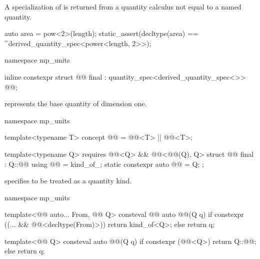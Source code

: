 \pnum
A specialization of 
is returned from a quantity calculus not equal to a named quantity.
\begin{example}
\begin{codeblock}
auto area = pow<2>(length);
static_assert(decltype(area) == ^derived_quantity_spec<power<length, 2>>);
\end{codeblock}
\end{example}

\begin{codeblock}
namespace mp_units {

inline constexpr struct @@ final : quantity_spec<derived_quantity_spec<>> {
} @@;

}
\end{codeblock}

\pnum
{} represents the base quantity of dimension one.

\begin{codeblock}
namespace mp_units {

template<typename T>
concept @@ = @@<T> || @@<T>;

template<typename Q>
  requires @@<Q> && @@<@@(Q{}), Q{}>
struct @@ final : Q::@@ {
  using @@ = kind_of_;
  static constexpr auto @@ = Q{};
};

}
\end{codeblock}

\pnum
{} specifies  to be treated as a quantity kind.

\begin{codeblock}
namespace mp_units {

template<@@ auto... From, @@ Q>
consteval @@ auto @@(Q q)
{
  if constexpr ((... && @@<decltype(From)>))
    return kind_of<Q{}>;
  else
    return q;
}

template<@@ Q>
consteval auto @@(Q q)
{
  if constexpr (@@<Q>)
    return Q::@@;
  else
    return q;
}

}
\end{codeblock}

